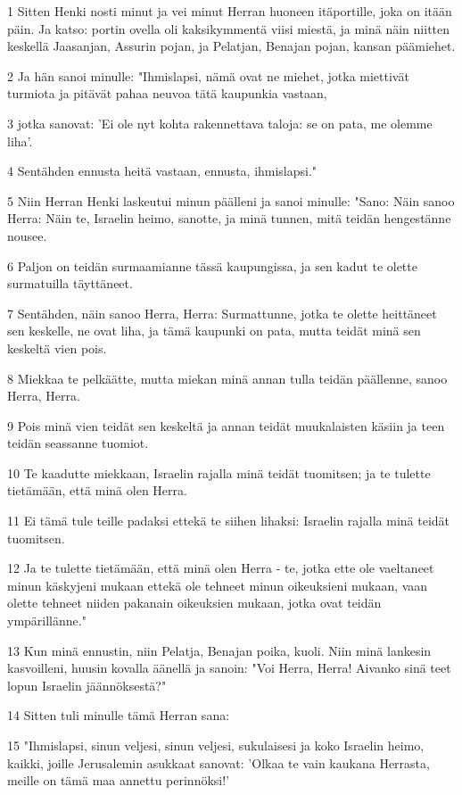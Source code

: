 \par 1 Sitten Henki nosti minut ja vei minut Herran huoneen itäportille, joka on itään päin. Ja katso: portin ovella oli kaksikymmentä viisi miestä, ja minä näin niitten keskellä Jaasanjan, Assurin pojan, ja Pelatjan, Benajan pojan, kansan päämiehet.
\par 2 Ja hän sanoi minulle: "Ihmislapsi, nämä ovat ne miehet, jotka miettivät turmiota ja pitävät pahaa neuvoa tätä kaupunkia vastaan,
\par 3 jotka sanovat: 'Ei ole nyt kohta rakennettava taloja: se on pata, me olemme liha'.
\par 4 Sentähden ennusta heitä vastaan, ennusta, ihmislapsi."
\par 5 Niin Herran Henki laskeutui minun päälleni ja sanoi minulle: "Sano: Näin sanoo Herra: Näin te, Israelin heimo, sanotte, ja minä tunnen, mitä teidän hengestänne nousee.
\par 6 Paljon on teidän surmaamianne tässä kaupungissa, ja sen kadut te olette surmatuilla täyttäneet.
\par 7 Sentähden, näin sanoo Herra, Herra: Surmattunne, jotka te olette heittäneet sen keskelle, ne ovat liha, ja tämä kaupunki on pata, mutta teidät minä sen keskeltä vien pois.
\par 8 Miekkaa te pelkäätte, mutta miekan minä annan tulla teidän päällenne, sanoo Herra, Herra.
\par 9 Pois minä vien teidät sen keskeltä ja annan teidät muukalaisten käsiin ja teen teidän seassanne tuomiot.
\par 10 Te kaadutte miekkaan, Israelin rajalla minä teidät tuomitsen; ja te tulette tietämään, että minä olen Herra.
\par 11 Ei tämä tule teille padaksi ettekä te siihen lihaksi: Israelin rajalla minä teidät tuomitsen.
\par 12 Ja te tulette tietämään, että minä olen Herra - te, jotka ette ole vaeltaneet minun käskyjeni mukaan ettekä ole tehneet minun oikeuksieni mukaan, vaan olette tehneet niiden pakanain oikeuksien mukaan, jotka ovat teidän ympärillänne."
\par 13 Kun minä ennustin, niin Pelatja, Benajan poika, kuoli. Niin minä lankesin kasvoilleni, huusin kovalla äänellä ja sanoin: "Voi Herra, Herra! Aivanko sinä teet lopun Israelin jäännöksestä?"
\par 14 Sitten tuli minulle tämä Herran sana:
\par 15 "Ihmislapsi, sinun veljesi, sinun veljesi, sukulaisesi ja koko Israelin heimo, kaikki, joille Jerusalemin asukkaat sanovat: 'Olkaa te vain kaukana Herrasta, meille on tämä maa annettu perinnöksi!'
